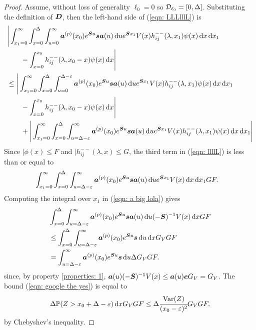 \begin{proof}
	Assume, without loss of generality \(\ell_0=0\) so \(\mathcal{D}_{\ell_0}=[0,\Delta]\). Substituting the definition of \(\boldsymbol D\), then the left-hand side of (\ref{eqn: LLLlllL}) is
	\begin{align}
		&\Bigg|\int_{x_1=0}^\infty \int_{x=0}^{\Delta}\int_{u=0}^\infty \boldsymbol a^{(p)}(x_0)e^{\boldsymbol Su}\boldsymbol s \boldsymbol a(u) \, \mathrm{d} u e^{\boldsymbol S x_1} V(x) h_{ij}^{--}(\lambda, x_1) \psi(x) \, \mathrm{d} x \, \mathrm{d} x_1\nonumber
		\\&{}\qquad {} - \int_{x=0}^{x_0} h_{ij}^{--}(\lambda, x_0 - x)\psi(x)\, \mathrm{d} x\Bigg| \nonumber
		\\&\leq \Bigg|\int_{x_1=0}^\infty \int_{x=0}^{\Delta}\int_{u=0}^{\Delta-\varepsilon} \boldsymbol a^{(p)}(x_0)e^{\boldsymbol Su}\boldsymbol s \boldsymbol a(u) \, \mathrm{d} u e^{\boldsymbol S x_1} V(x) h_{ij}^{--}(\lambda, x_1) \psi(x) \, \mathrm{d} x \, \mathrm{d} x_1\nonumber
		\\&{}\qquad {} - \int_{x=0}^{x_0} h_{ij}^{--}(\lambda, x_0 - x)\psi(x)\, \mathrm{d} x\Bigg| \nonumber
		\\&\qquad {}+\Bigg|\int_{x_1=0}^\infty \int_{x=0}^{\Delta}\int_{u= \Delta-\varepsilon}^\infty  \boldsymbol a^{(p)}(x_0)e^{\boldsymbol Su}\boldsymbol s \boldsymbol a(u) \, \mathrm{d} u e^{\boldsymbol S x_1} V(x) h_{ij}^{--}(\lambda, x_1) \psi(x) \, \mathrm{d} x \, \mathrm{d} x_1\Bigg| \label{eqn: llllL}
	\end{align}
	Since \(|\phi(x)\leq F\) and \(|h_{ij}^{--}(\lambda,x)\leq G\), the third term in (\ref{eqn: llllL}) is less than or equal to 
	\begin{align}
		&\int_{x_1=0}^\infty \int_{x=0}^{\Delta}\int_{u= \Delta-\varepsilon}^\infty  \boldsymbol a^{(p)}(x_0)e^{\boldsymbol Su}\boldsymbol s \boldsymbol a(u) \, \mathrm{d} u e^{\boldsymbol S x_1} V(x) \, \mathrm{d} x \, \mathrm{d} x_1G F.\label{eqn: a big lola}
	\end{align} 
	Computing the integral over \(x_1\) in (\ref{eqn: a big lola}) gives
	\begin{align}
		& \int_{x=0}^{\Delta}\int_{u= \Delta-\varepsilon}^\infty  \boldsymbol a^{(p)}(x_0)e^{\boldsymbol Su}\boldsymbol s \boldsymbol a(u) \, \mathrm{d} u (-\boldsymbol S)^{-1}V(x) \, \mathrm{d} x G F\nonumber
		\\&\leq  \int_{x=0}^{\Delta}\int_{u= \Delta-\varepsilon}^\infty  \boldsymbol a^{(p)}(x_0)e^{\boldsymbol Su}\boldsymbol s \, \mathrm{d} u \, \mathrm{d} x G_V G F \nonumber
		\\&= \int_{u= \Delta-\varepsilon}^\infty  \boldsymbol a^{(p)}(x_0)e^{\boldsymbol Su}\boldsymbol s  \, \mathrm{d} u\Delta G_V G F.\label{eqn: google the yes}
	\end{align}
	since, by property \ref{properties: 1}, \(\boldsymbol a(u)(-\boldsymbol S)^{-1}V(x)\leq \boldsymbol a (u)\boldsymbol e G_V=G_V\). The bound (\ref{eqn: google the yes}) is equal to 
	\begin{align}
		\Delta \mathbb P(Z>x_0 + \Delta-\varepsilon) \, \mathrm{d} x G_V G F
		\leq  \Delta \cfrac{\mathrm{Var}(Z)}{(x_0-\varepsilon)^2} G_V G F, \label{eqn: JjJ}
	\end{align}
	by Chebyshev's inequality. 
	

\end{proof}
